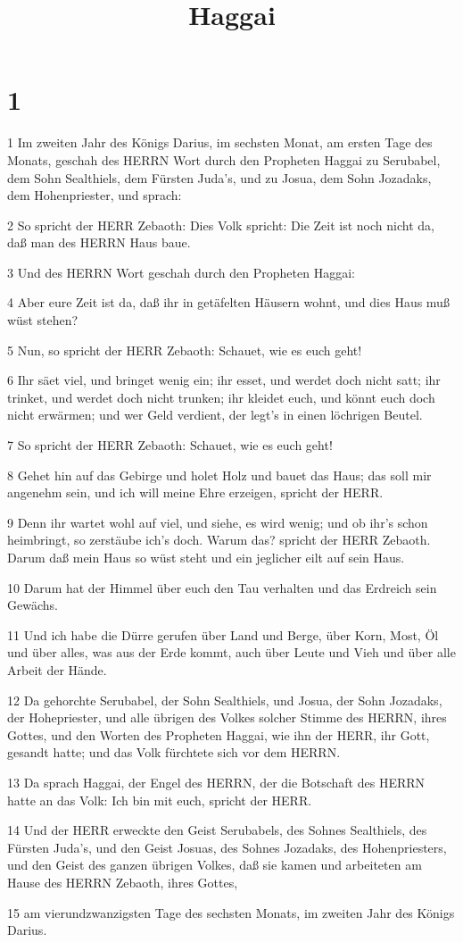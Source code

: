 

\title{Haggai}


\chapter{1}

\par 1 Im zweiten Jahr des Königs Darius, im sechsten Monat, am ersten Tage des Monats, geschah des HERRN Wort durch den Propheten Haggai zu Serubabel, dem Sohn Sealthiels, dem Fürsten Juda's, und zu Josua, dem Sohn Jozadaks, dem Hohenpriester, und sprach:
\par 2 So spricht der HERR Zebaoth: Dies Volk spricht: Die Zeit ist noch nicht da, daß man des HERRN Haus baue.
\par 3 Und des HERRN Wort geschah durch den Propheten Haggai:
\par 4 Aber eure Zeit ist da, daß ihr in getäfelten Häusern wohnt, und dies Haus muß wüst stehen?
\par 5 Nun, so spricht der HERR Zebaoth: Schauet, wie es euch geht!
\par 6 Ihr säet viel, und bringet wenig ein; ihr esset, und werdet doch nicht satt; ihr trinket, und werdet doch nicht trunken; ihr kleidet euch, und könnt euch doch nicht erwärmen; und wer Geld verdient, der legt's in einen löchrigen Beutel.
\par 7 So spricht der HERR Zebaoth: Schauet, wie es euch geht!
\par 8 Gehet hin auf das Gebirge und holet Holz und bauet das Haus; das soll mir angenehm sein, und ich will meine Ehre erzeigen, spricht der HERR.
\par 9 Denn ihr wartet wohl auf viel, und siehe, es wird wenig; und ob ihr's schon heimbringt, so zerstäube ich's doch. Warum das? spricht der HERR Zebaoth. Darum daß mein Haus so wüst steht und ein jeglicher eilt auf sein Haus.
\par 10 Darum hat der Himmel über euch den Tau verhalten und das Erdreich sein Gewächs.
\par 11 Und ich habe die Dürre gerufen über Land und Berge, über Korn, Most, Öl und über alles, was aus der Erde kommt, auch über Leute und Vieh und über alle Arbeit der Hände.
\par 12 Da gehorchte Serubabel, der Sohn Sealthiels, und Josua, der Sohn Jozadaks, der Hohepriester, und alle übrigen des Volkes solcher Stimme des HERRN, ihres Gottes, und den Worten des Propheten Haggai, wie ihn der HERR, ihr Gott, gesandt hatte; und das Volk fürchtete sich vor dem HERRN.
\par 13 Da sprach Haggai, der Engel des HERRN, der die Botschaft des HERRN hatte an das Volk: Ich bin mit euch, spricht der HERR.
\par 14 Und der HERR erweckte den Geist Serubabels, des Sohnes Sealthiels, des Fürsten Juda's, und den Geist Josuas, des Sohnes Jozadaks, des Hohenpriesters, und den Geist des ganzen übrigen Volkes, daß sie kamen und arbeiteten am Hause des HERRN Zebaoth, ihres Gottes,
\par 15 am vierundzwanzigsten Tage des sechsten Monats, im zweiten Jahr des Königs Darius.

